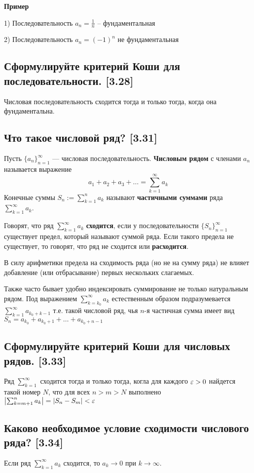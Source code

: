 \documentclass[12pt, a4paper]{article}
\begin{document}
    \textbf{Пример}

    1) Последовательность $a_n = \frac{1}{n}$ -- фундаментальная
    
    2) Последовательность $a_n = (-1)^n$ не фундаментальная
    \subsection{Сформулируйте критерий Коши для последовательности. [3.28]}
    Числовая последовательность сходится тогда и только тогда, когда она фундаментальна.
    \subsection{Что такое числовой ряд? [3.31]}
    Пусть $\{a_n\}^{\infty}_{n=1}$ --- числовая последовательность. \textbf{Числовым рядом} с членами $a_n$ называется выражение 
    \begin{equation*}
        a_1 + a_2 + a_3 + \dots = \sum_{k=1}^{\infty} a_k
    \end{equation*}
    Конечные суммы $S_n := \sum_{k=1}^{n} a_k$ называют \textbf{частичными суммами} ряда $\sum_{k=1}^{\infty} a_k$.

    Говорят, что ряд $\sum_{k=1}^{\infty} a_k$ \textbf{сходится}, если у последовательности $\{S_n\}^{\infty}_{n=1}$ существует предел, который называют суммой ряда. Если такого предела не существует, то говорят, что ряд не сходится или \textbf{расходится}.

    В силу арифметики предела на сходимость ряда (но не на сумму ряда) не влияет добавление (или отбрасывание) первых нескольких слагаемых.

    Также часто бывает удобно индексировать суммирование не только натуральным рядом. Под выражением $\sum_{k=k_0}^{\infty} a_k$ естественным образом подразумевается $\sum_{k=1}^{\infty} a_{k_0 + k-1}$ т.е. такой числовой ряд, чья $n$-я частичная сумма имеет вид $S_n = a_{k_0} + a_{k_0 + 1} + \dots + a_{k_0 + n -1}$
    \subsection{Сформулируйте критерий Коши для числовых рядов. [3.33]}
    Ряд $\sum_{k=1}^{\infty}$ сходится тогда и только тогда, когла для каждого $\varepsilon > 0$ найдется такой номер $N$, что для всех $n > m > N$ выполнено $\left|\sum_{k = m + 1}^{n} a_k\right| = |S_n - S_m| < \varepsilon$
    \subsection{Каково необходимое условие сходимости числового ряда? [3.34]}
    Если ряд $\sum_{k=1}^{\infty} a_k$ сходится, то $a_k \to 0$ при $k \to \infty$.
\end{document}
